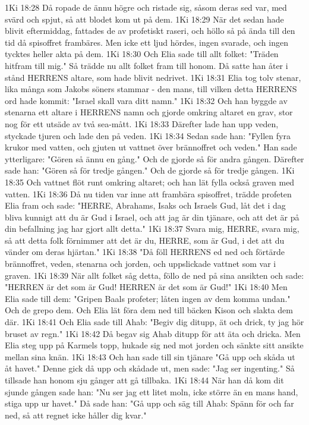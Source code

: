 1Ki 18:28  Då ropade de ännu högre och ristade sig, såsom deras sed var, med svärd och spjut, så att blodet kom ut på dem.
1Ki 18:29  När det sedan hade blivit eftermiddag, fattades de av profetiskt raseri, och höllo så på ända till den tid då spisoffret frambäres. Men icke ett ljud hördes, ingen svarade, och ingen tycktes heller akta på dem.
1Ki 18:30  Och Elia sade till allt folket: "Träden hitfram till mig." Så trädde nu allt folket fram till honom. Då satte han åter i stånd HERRENS altare, som hade blivit nedrivet.
1Ki 18:31  Elia tog tolv stenar, lika många som Jakobs söners stammar - den mans, till vilken detta HERRENS ord hade kommit: "Israel skall vara ditt namn."
1Ki 18:32  Och han byggde av stenarna ett altare i HERRENS namn och gjorde omkring altaret en grav, stor nog för ett utsäde av två sea-mått.
1Ki 18:33  Därefter lade han upp veden, styckade tjuren och lade den på veden.
1Ki 18:34  Sedan sade han: "Fyllen fyra krukor med vatten, och gjuten ut vattnet över brännoffret och veden." Han sade ytterligare: "Gören så ännu en gång." Och de gjorde så för andra gången. Därefter sade han: "Gören så för tredje gången." Och de gjorde så för tredje gången.
1Ki 18:35  Och vattnet flöt runt omkring altaret; och han lät fylla också graven med vatten.
1Ki 18:36  Då nu tiden var inne att frambära spisoffret, trädde profeten Elia fram och sade: "HERRE, Abrahams, Isaks och Israels Gud, låt det i dag bliva kunnigt att du är Gud i Israel, och att jag är din tjänare, och att det är på din befallning jag har gjort allt detta."
1Ki 18:37  Svara mig, HERRE, svara mig, så att detta folk förnimmer att det är du, HERRE, som är Gud, i det att du vänder om deras hjärtan."
1Ki 18:38  "Då föll HERRENS ed ned och förtärde brännoffret, veden, stenarna och jorden, och uppslickade vattnet som var i graven.
1Ki 18:39  När allt folket såg detta, föllo de ned på sina ansikten och sade: "HERREN är det som är Gud! HERREN är det som är Gud!"
1Ki 18:40  Men Elia sade till dem: "Gripen Baals profeter; låten ingen av dem komma undan." Och de grepo dem. Och Elia lät föra dem ned till bäcken Kison och slakta dem där.
1Ki 18:41  Och Elia sade till Ahab: "Begiv dig ditupp, ät och drick, ty jag hör bruset av regn."
1Ki 18:42  Då begav sig Ahab ditupp för att äta och dricka. Men Elia steg upp på Karmels topp, hukade sig ned mot jorden och sänkte sitt ansikte mellan sina knän.
1Ki 18:43  Och han sade till sin tjänare "Gå upp och skåda ut åt havet." Denne gick då upp och skådade ut, men sade: "Jag ser ingenting." Så tillsade han honom sju gånger att gå tillbaka.
1Ki 18:44  När han då kom dit sjunde gången sade han: "Nu ser jag ett litet moln, icke större än en mans hand, stiga upp ur havet." Då sade han: "Gå upp och säg till Ahab: Spänn för och far ned, så att regnet icke håller dig kvar."
